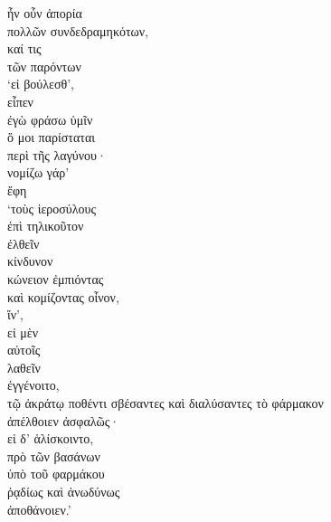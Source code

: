 {\large
\begin{greek}
\noindent ἦν οὖν ἀπορία \\
\tabto{2em} πολλῶν συνδεδραμηκότων, \\
καί τις \\
\tabto{2em} τῶν παρόντων \\
‘εἰ βούλεσθ', \\
εἶπεν\\
ἐγὼ φράσω ὑμῖν \\
\tabto{2em} ὅ μοι παρίσταται \\
\tabto{4em} περὶ τῆς λαγύνου· \\
νομίζω γάρ’ \\
\tabto{2em} ἔφη \\
‘τοὺς ἱεροσύλους \\
\tabto{2em} ἐπὶ τηλικοῦτον \\
ἐλθεῖν \\
\tabto{2em} κίνδυνον \\
κώνειον ἐμπιόντας \\
καὶ κομίζοντας οἶνον, \\
ἵν', \\
\tabto{2em} εἰ μὲν \\
\tabto{4em} αὐτοῖς \\
\tabto{4em} λαθεῖν \\
\tabto{2em} ἐγγένοιτο, \\
τῷ ἀκράτῳ ποθέντι σβέσαντες καὶ διαλύσαντες τὸ φάρμακον \\
\tabto{2em} ἀπέλθοιεν ἀσφαλῶς· \\
\tabto{2em} εἰ δ' ἁλίσκοιντο, \\
\tabto{4em} πρὸ τῶν βασάνων \\
\tabto{4em} ὑπὸ τοῦ φαρμάκου \\
\tabto{4em} ῥᾳδίως καὶ ἀνωδύνως \\
\tabto{2em} ἀποθάνοιεν.’\\

\end{greek}
}

